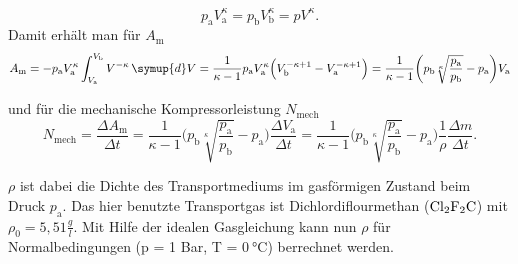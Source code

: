 \begin{equation}
p_\text{a}V^\kappa_\text{a} = p_\text{b}V^\kappa_\text{b} = pV^\kappa.
\label{eqn:poisson}
\end{equation}
Damit erhält man für $A_\text{m}$
\begin{equation}
A_\text{m} = - p_\text{a}V^\kappa_\text{a}\int_{V_\text{a}}^{V_\text{b}} V^{-\kappa} \, \symup{d}V = \frac{1}{\kappa-1}p_\text{a}V^\kappa_\text{a}\Bigl(V^{-\kappa+1}_\text{b}-V^{-\kappa+1}_\text{a}\Bigr) = \frac{1}{\kappa-1}\biggl(p_\text{b}\sqrt[\kappa]{\frac{p_\text{a}}{p_\text{b}}} - p_\text{a}\biggr) V_\text{a}
\label{eqn:A_m}
\end{equation}

und für die mechanische Kompressorleistung $N_\text{mech}$
\begin{equation}
N_\text{mech} = \frac{\Delta A_\text{m}}{\Delta t} = \frac{1}{\kappa-1}\biggl(p_\text{b}\sqrt[\kappa]{\frac{p_\text{a}}{p_\text{b}}} - p_\text{a}\biggr) \frac{\Delta V_\text{a}}{\Delta t} = \frac{1}{\kappa-1}\biggl(p_\text{b}\sqrt[\kappa]{\frac{p_\text{a}}{p_\text{b}}} - p_\text{a}\biggr) \frac{1}{\rho} \frac{\Delta m}{\Delta t}.
\label{nmech2}
\end{equation}

$\rho$ ist dabei die Dichte des Transportmediums im gasförmigen Zustand beim Druck $p_\text{a}$.
Das hier benutzte Transportgas ist Dichlordiflourmethan ($\ce{Cl2F2C}$) mit $\rho_0 = 5,51\frac{g}{l}$. 
Mit Hilfe der idealen Gasgleichung kann nun $\rho$ für Normalbedingungen (p = 1 Bar, T = $\SI{0}{\celsius}$) berrechnet werden.

